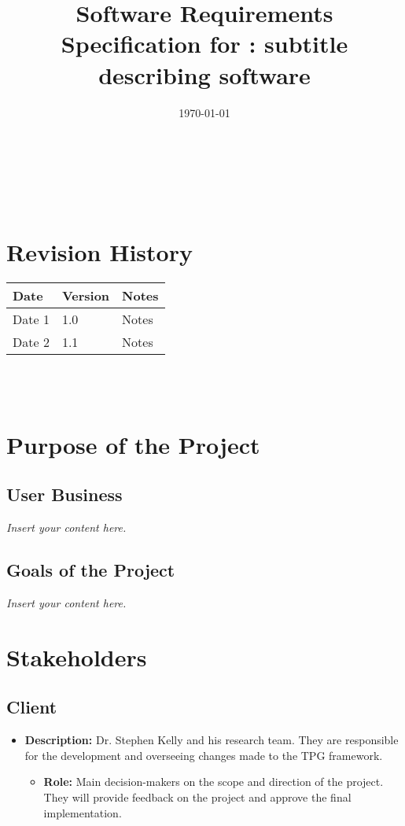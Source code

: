 \documentclass[12pt]{article}
\newcommand{\lips}{\textit{Insert your content here.}}
\begin{document}
\title{Software Requirements Specification for \progname: subtitle describing software} 
\author{\authname}
\date{\today}
	
\maketitle

~\newpage


\tableofcontents

~\newpage

\section*{Revision History}

\begin{tabularx}{\textwidth}{p{3cm}p{2cm}X}
\toprule {\textbf{Date}} & {\textbf{Version}} & {\textbf{Notes}}\\
\midrule
Date 1 & 1.0 & Notes\\
Date 2 & 1.1 & Notes\\
\bottomrule
\end{tabularx}

~\\

~\newpage
\section{Purpose of the Project}
\subsection{User Business}
\lips
\subsection{Goals of the Project}
\lips
\section{Stakeholders}
\subsection{Client}
\begin{itemize}
  \item \textbf{Description:} Dr. Stephen Kelly and his research team. They are responsible for the development and overseeing changes made to the TPG framework.
    \begin{itemize}
      \item \textbf{Role:} Main decision-makers on the scope and direction of the project. They will provide feedback on the project and approve the final implementation.
    \end{itemize}

  \end{itemize}
\end{document}
